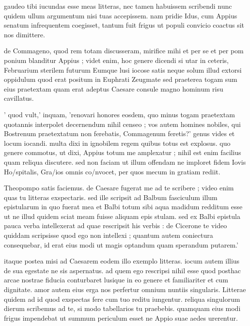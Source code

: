 


 gaudeo tibi iucundas esse meas litteras, nec tamen habuissem scribendi nunc quidem ullum argumentum nisi tuas accepissem. nam pridie Idus, cum Appius senatum infrequentem coegisset, tantum fuit frigus ut populi convicio coactus sit nos dimittere.

 de Commageno, quod rem totam discusseram, mirifice mihi et per se et per pom ponium blanditur Appius ; videt enim, hoc genere dicendi si utar in ceteris, Februarium sterilem futurum Eumque lusi iocose satis neque solum illud extorsi oppidulum quod erat positum in Euphrati Zeugmate sed praeterea togam sum eius praetextam quam erat adeptus Caesare consule magno hominum risu cavillatus.

 ' quod vult,' inquam, 'renovari honores eosdem, quo minus togam praetextam quotannis interpolet decernendum nihil censeo ; vos autem homines nobiles, qui Bostrenum praetextatum non ferebatis, Commagenum feretis?' genus vides et locum iocandi. multa dixi in ignobilem regem quibus totus est explosus. quo genere commotus, ut dixi, Appius totum me amplexatur ; nihil est enim facilius quam reliqua discutere. sed non faciam ut illum offendam ne imploret fidem Iovis Ho/spitalis, Gra/ios omnis co/nvocet, per quos mecum in gratiam rediit.

 Theopompo satis faciemus. de Caesare fugerat me ad te scribere ; video enim quas tu litteras exspectaris. sed ille scripsit ad Balbum fasciculum illum epistularum in quo fuerat mea et Balbi totum sibi aqua madidum redditum esse ut ne illud quidem sciat meam fuisse aliquam epis stulam. sed ex Balbi epistula pauca verba intellexerat ad quae rescripsit his verbis : de Cicerone te video quiddam scripsisse quod ego non intellexi ; quantum autem coniectura consequebar, id erat eius modi ut magis optandum quam sperandum putarem.'

 itaque postea misi ad Caesarem eodem illo exemplo litteras. iocum autem illius de sua egestate ne sis aspernatus. ad quem ego rescripsi nihil esse quod posthac arcae nostrae fiducia conturbaret lusique in eo genere et familiariter et cum dignitate. amor autem eius erga nos perfertur omnium nuntiis singularis. Litterae quidem ad id quod exspectas fere cum tuo reditu iungentur. reliqua singulorum dierum scribemus ad te, si modo tabellarios tu praebebis. quamquam eius modi frigus impendebat ut summum periculum esset ne Appio suae aedes urerentur.
